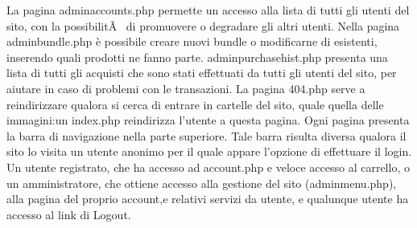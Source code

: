 La pagina adminaccounts.php permette un accesso alla lista di tutti gli utenti del sito, con la possibilitÃ  di promuovere o degradare gli altri utenti.
Nella pagina adminbundle.php è possibile creare nuovi bundle o modificarne di esistenti, inserendo quali prodotti ne fanno parte.
adminpurchasehist.php presenta una lista di tutti gli acquisti che sono stati effettuati da tutti gli utenti del sito, per aiutare in caso di problemi con le transazioni.
La pagina 404.php serve a reindirizzare qualora si cerca di entrare in cartelle del sito, quale quella delle immagini:un index.php reindirizza l'utente a questa pagina.
Ogni pagina presenta la barra di navigazione nella parte superiore. Tale barra risulta diversa qualora il sito lo visita un utente anonimo per il quale appare l'opzione di effettuare il login. Un utente registrato, che ha accesso ad account.php e veloce accesso al carrello, o un amministratore, che ottiene accesso alla gestione del sito (adminmenu.php), alla pagina del proprio account,e relativi servizi da utente, e qualunque utente ha accesso al link di Logout.
